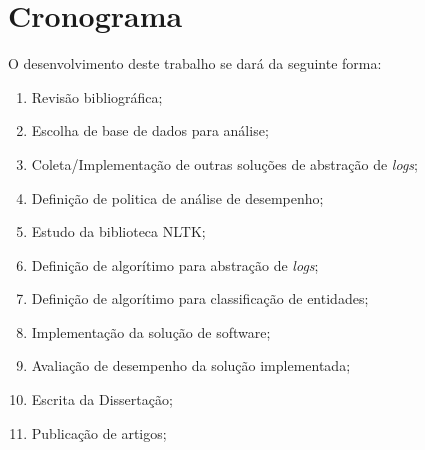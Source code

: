\documentclass[
	12pt,				%
	openright,			%
	twoside,			%
	a4paper,			%
	english,			%
	spanish,			%
	brazil,				%
	]{abntex2}
\begin{document}
\chapter{Cronograma}\label{chap:cronograma}
O desenvolvimento deste trabalho se dará da seguinte forma:

\begin{enumerate}
	\item \label{rev-bibli} Revisão bibliográfica;
	\item \label{esc-base} Escolha de base de dados para análise;
	\item \label{imp-outras} Coleta/Implementação de outras soluções de abstração de \emph{logs};
	\item \label{def-pol} Definição de politica de análise de desempenho;
	\item \label{est-nltk} Estudo da biblioteca NLTK;
	\item \label{algo-abs} Definição de algorítimo para abstração de \emph{logs};
	\item \label{algo-clas} Definição de algorítimo para classificação de entidades;
	\item \label{imp-sol} Implementação da solução de software;
	\item \label{ava-des} Avaliação de desempenho da solução implementada;
	\item \label{esc-dis} Escrita da Dissertação;
	\item \label{pub-art} Publicação de artigos;
\end{enumerate}
\end{document}
